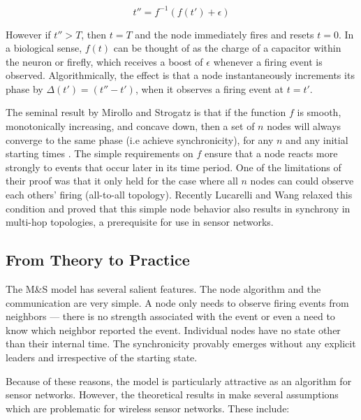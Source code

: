 \documentclass{sig-alternate}
\begin{document}
\begin{equation}
\label{eqn:strogatz}
t'' = f^{-1}(f(t') + \epsilon)
\end{equation}

However if $t'' > T$, then $t = T$ and the node immediately fires and
resets $t=0$. In a biological sense, $f(t)$ can be thought of as the
charge of a capacitor within the neuron or firefly, which receives a
boost of $\epsilon$ whenever a firing event is
observed. Algorithmically, the effect is that a node instantaneously
increments its phase by $\Delta(t') = (t'' - t')$, when it observes a
firing event at $t=t'$.

The seminal result by Mirollo and Strogatz is that if the function $f$
is smooth, monotonically increasing, and concave down, then a set of
$n$ nodes will always converge to the same phase (i.e achieve
synchronicity), for any $n$ and any initial starting times
\cite{strogatz}. The simple requirements on $f$ ensure that a node
reacts more strongly to events that occur later in its time
period. One of the limitations of their proof was that it only held
for the case where all $n$ nodes can could observe each others' firing
(all-to-all topology). Recently Lucarelli and Wang \cite{lucarelli04}
relaxed this condition and proved that this simple node behavior also
results in synchrony in multi-hop topologies, a prerequisite for use
in sensor networks.

\subsection{From Theory to Practice}

The M\&S model has several salient features. The node algorithm and
the communication are very simple. A node only needs to observe firing
events from neighbors --- there is no strength associated with the
event or even a need to know which neighbor reported the
event. Individual nodes have no state other than their internal
time. The synchronicity provably emerges without any explicit leaders
and irrespective of the starting state.

Because of these reasons, the model is particularly attractive as an
algorithm for sensor networks. However, the theoretical results in
\cite{strogatz,lucarelli04} make several assumptions which are
problematic for wireless sensor networks. These include:
\end{document}
